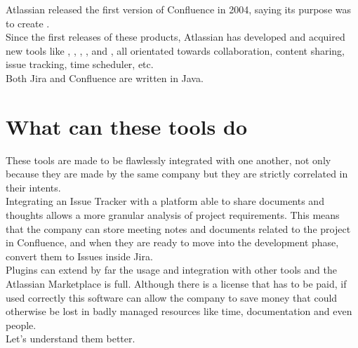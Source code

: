 	Atlassian released the first version of Confluence in 2004, saying its purpose was to create \cite{theserverside}.\\
	Since the first releases of these products, Atlassian has developed and acquired new tools like , , , , and , all orientated towards collaboration, content sharing, issue tracking, time scheduler, etc.\\
	Both Jira and Confluence are written in Java.

\section{What can these tools do}
	These tools are made to be flawlessly integrated with one another, not only because they are made by the same company but they are strictly correlated in their intents.\\
	Integrating an Issue Tracker with a platform able to share documents and thoughts allows a more granular analysis of project requirements.
	This means that the company can store meeting notes and documents related to the project in Confluence, and when they are ready to move into the development phase, convert them to Issues inside Jira.\\
	Plugins can extend by far the usage and integration with other tools and the Atlassian Marketplace \cite{marketplace.atlassian} is full.
	Although there is a license that has to be paid, if used correctly this software can allow the company to save money that could otherwise be lost in badly managed resources like time, documentation and even people.\\
	Let's understand them better.
